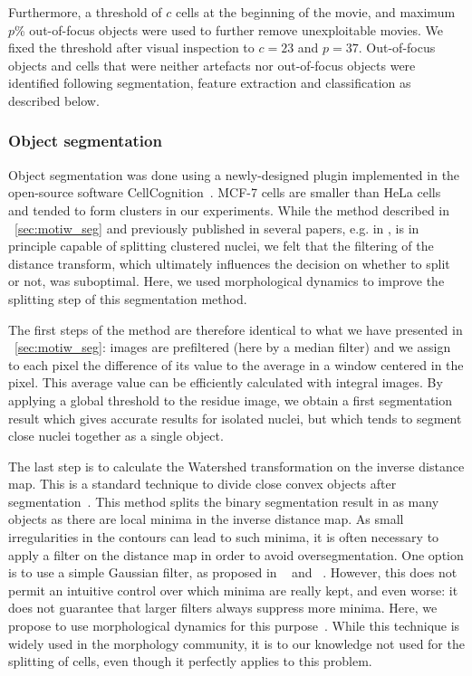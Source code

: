 Furthermore, a threshold of $c$ cells at the beginning of the movie, and maximum $p$\% out-of-focus objects were used to further remove unexploitable movies.   
We fixed the threshold after visual inspection to $c=23$ and $p=37$. Out-of-focus objects and cells that were neither artefacts nor out-of-focus objects were identified following segmentation, feature extraction and classification as described below.

\subsubsection{Object segmentation}

Object segmentation was done using a newly-designed plugin implemented
in the open-source software CellCognition~\cite{cellcognition}. MCF-7
cells are smaller than HeLa cells and tended to form clusters in our
experiments. While the method described in ~\ref{sec:motiw_seg}
and previously published in several papers, e.g. in
\cite{cellcognition}, is in principle capable of splitting clustered
nuclei, we felt that the filtering of the distance transform, 
which ultimately influences the decision on whether to split or not, was suboptimal. 
Here, we used morphological dynamics to improve the splitting step of
this segmentation method.

The first steps of the method are therefore identical to what we have
presented in ~\ref{sec:motiw_seg}: images are prefiltered (here by a
median filter) and we assign to each pixel the difference of its value
to the average in a window centered in the pixel. This average value
can be efficiently calculated with integral images. By applying a
global threshold to the residue image, we obtain a first segmentation
result which gives accurate results for isolated nuclei, but which
tends to segment close nuclei together as a single object. 

The last step is to calculate the Watershed transformation on the
inverse distance map. This is a
standard technique to divide close convex objects after
segmentation~\cite[Chapter Geodesic segmentation]{lantuejoul}. This
method splits the binary segmentation
result in as many objects as there are local minima in the inverse
distance map. As small irregularities in the contours can lead to such
minima, it is often necessary to apply a filter on the distance map in
order to avoid oversegmentation. One option is to use a simple
Gaussian filter, as proposed in ~\cite{Wahlby2002} and
~\cite{cellcognition}. However, this does not permit an intuitive
control over which minima are really kept, and even worse: it does not guarantee that larger filters always suppress more minima. 
Here, we propose to use morphological dynamics for this
purpose~\cite{Soille:2003:MIA:773286}.  While this technique is widely
used in the morphology community, it is to our knowledge not used for
the splitting of cells, even though it perfectly applies to this
problem. 

